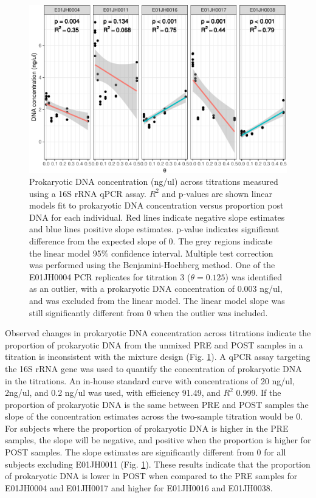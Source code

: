 \begin{figure}
\centering
\includegraphics{bacPlot-1.pdf}
\caption{\label{fig:bacPlot}Prokaryotic DNA concentration (ng/ul) across
titrations measured using a 16S rRNA qPCR assay. \(R^2\) and p-values are shown linear models fit to prokaryotic DNA concentration versus proportion post DNA for each individual. 
Red lines indicate negative slope estimates and blue lines positive slope estimates.
p-value indicates significant difference from the expected slope of 0.
The grey regions indicate the linear model 95\% confidence interval.
Multiple test correction was performed using the Benjamini-Hochberg
method. One of the E01JH0004 PCR replicates for titration 3
(\(\theta=0.125\)) was identified as an outlier, with a prokaryotic DNA concentration of
0.003 ng/ul, and was excluded from the linear model. The linear model slope
was still significantly different from 0 when the outlier was included.}
\end{figure}

Observed changes in prokaryotic DNA concentration across titrations
indicate the proportion of prokaryotic DNA from the unmixed PRE and POST
samples in a titration is inconsistent with the mixture design (Fig.
\ref{fig:bacPlot}). A qPCR assay targeting the 16S rRNA gene was used to
quantify the concentration of prokaryotic DNA in the titrations. An
in-house standard curve with concentrations of 20 ng/ul, 2ng/ul, and 0.2
ng/ul was used, with efficiency 91.49, and \(R^2\) 0.999. If the
proportion of prokaryotic DNA is the same between PRE and POST samples
the slope of the concentration estimates across the two-sample titration
would be 0. For subjects where the proportion of prokaryotic DNA is
higher in the PRE samples, the slope will be negative, and positive when
the proportion is higher for POST samples. The slope estimates are
significantly different from 0 for all subjects excluding E01JH0011
(Fig. \ref{fig:bacPlot}). These results indicate that the proportion of
prokaryotic DNA is lower in POST when compared to the PRE samples for
E01JH0004 and E01JH0017 and higher for E01JH0016 and E01JH0038.




